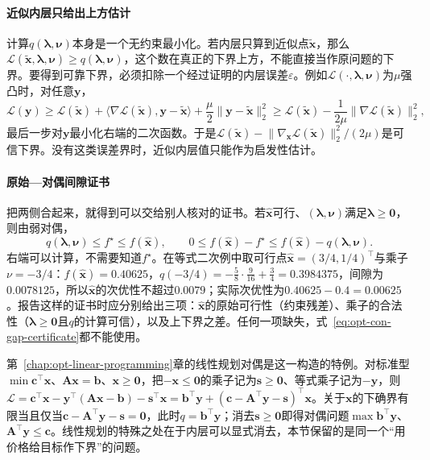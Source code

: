 \paragraph{近似内层只给出上方估计}
计算$q(\bm\lambda,\bm\nu)$本身是一个无约束最小化。若内层只算到近似点$\tilde{\bm x}$，那么$\mathcal L(\tilde{\bm x},\bm\lambda,\bm\nu)\geq q(\bm\lambda,\bm\nu)$，这个数在真正的下界上方，不能直接当作原问题的下界。要得到可靠下界，必须扣除一个经过证明的内层误差$\varepsilon$。例如$\mathcal L(\cdot,\bm\lambda,\bm\nu)$为$\mu$强凸时，对任意$\bm y$，
\[
  \mathcal L(\bm y)\geq\mathcal L(\tilde{\bm x})+\langle\nabla\mathcal L(\tilde{\bm x}),\bm y-\tilde{\bm x}\rangle+\frac\mu2\lVert\bm y-\tilde{\bm x}\rVert_2^2\geq\mathcal L(\tilde{\bm x})-\frac{1}{2\mu}\lVert\nabla\mathcal L(\tilde{\bm x})\rVert_2^2,
\]
最后一步对$\bm y$最小化右端的二次函数。于是$\mathcal L(\tilde{\bm x})-\lVert\nabla_{\bm x}\mathcal L(\tilde{\bm x})\rVert_2^2/(2\mu)$是可信下界。没有这类误差界时，近似内层值只能作为启发性估计。

\paragraph{原始—对偶间隙证书}
把两侧合起来，就得到可以交给别人核对的证书。若$\hat{\bm x}$可行、$(\bm\lambda,\bm\nu)$满足$\bm\lambda\geq\bm0$，则由弱对偶，
\begin{equation}
\label{eq:opt-con-gap-certificate}
  q(\bm\lambda,\bm\nu)\leq f^\star\leq f(\hat{\bm x}),\qquad
  0\leq f(\hat{\bm x})-f^\star\leq f(\hat{\bm x})-q(\bm\lambda,\bm\nu).
\end{equation}
右端可以计算，不需要知道$f^\star$。在等式二次例中取可行点$\hat{\bm x}=(3/4,1/4)^\top$与乘子$\nu=-3/4$：$f(\hat{\bm x})=0.40625$，$q(-3/4)=-\frac58\cdot\frac9{16}+\frac34=0.3984375$，间隙为$0.0078125$，所以$\hat{\bm x}$的次优性不超过$0.0079$；实际次优性为$0.40625-0.4=0.00625$。报告这样的证书时应分别给出三项：$\hat{\bm x}$的原始可行性（约束残差）、乘子的合法性（$\bm\lambda\geq\bm0$且$q$的计算可信），以及上下界之差。任何一项缺失，式~\eqref{eq:opt-con-gap-certificate}都不能使用。

第~\ref{chap:opt-linear-programming}章的线性规划对偶是这一构造的特例。对标准型$\min\bm c^\top\bm x$、$\bm A\bm x=\bm b$、$\bm x\geq\bm0$，把$-\bm x\leq\bm0$的乘子记为$\bm s\geq\bm0$、等式乘子记为$-\bm y$，则$\mathcal L=\bm c^\top\bm x-\bm y^\top(\bm A\bm x-\bm b)-\bm s^\top\bm x=\bm b^\top\bm y+(\bm c-\bm A^\top\bm y-\bm s)^\top\bm x$。关于$\bm x$的下确界有限当且仅当$\bm c-\bm A^\top\bm y-\bm s=\bm0$，此时$q=\bm b^\top\bm y$；消去$\bm s\geq\bm0$即得对偶问题$\max\bm b^\top\bm y$、$\bm A^\top\bm y\leq\bm c$。线性规划的特殊之处在于内层可以显式消去，本节保留的是同一个“用价格给目标作下界”的问题。

